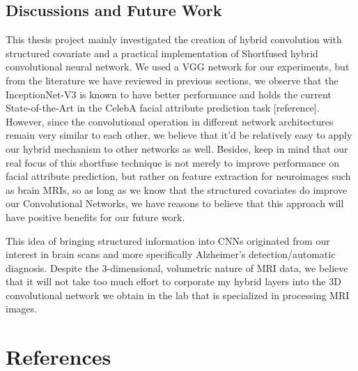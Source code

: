 \documentclass[12pt]{article}
\begin{document}
\subsection{Discussions and Future Work}
This thesis project mainly investigated the creation of hybrid convolution with structured covariate and a practical implementation of Shortfused hybrid convolutional neural network. We used a VGG network for our experiments, but from the literature we have reviewed in previous sections, we observe that the InceptionNet-V3 is known to have better performance and holds the current State-of-the-Art in the CelebA facial attribute prediction task [reference]. However, since the convolutional operation in different network architectures remain very similar to each other, we believe that it'd be relatively easy to apply our hybrid mechanism to other networks as well. Besides, keep in mind that our real focus of this shortfuse technique is not merely to improve performance on facial attribute prediction, but rather on feature extraction for neuroimages such as brain MRIs, so as long as we know that the structured covariates do improve our Convolutional Networks, we have reasons to believe that this approach will have positive benefits for our future work.  


This idea of bringing structured information into CNNs originated from our interest in brain scans and more specifically Alzheimer's detection/automatic diagnosis. Despite the 3-dimensional, volumetric nature of MRI data, we believe that it will not take too much effort to corporate my hybrid layers into the 3D convolutional network we obtain in the lab that is specialized in processing MRI images. 



\section{References}
\end{document}
